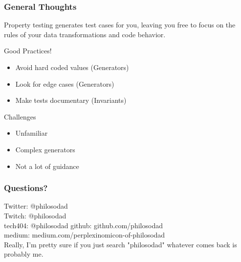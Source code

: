 \begin{frame}
  \frametitle{General Thoughts}
  Property testing generates test cases for you, leaving you free to focus on the rules of your data transformations and code behavior.
  \begin{block}{Good Practices!}
    \begin{itemize}
      \item Avoid hard coded values (Generators)
      \item Look for edge cases (Generators)
      \item Make tests documentary (Invariants)
    \end{itemize}
  \end{block}
  \begin{block}{Challenges}
    \begin{itemize}
      \item Unfamiliar
      \item Complex generators
      \item Not a lot of guidance
    \end{itemize}
  \end{block}
\end{frame}
\begin{frame}
  \frametitle{Questions?}
  Twitter: @philosodad \\
  Twitch: @philosodad\\
  tech404: @philosodad
  github: github.com/philosodad\\
  medium: medium.com/perplexinomicon-of-philosodad\\


  Really, I'm pretty sure if you just search "philosodad" whatever comes back is probably me.
\end{frame}
